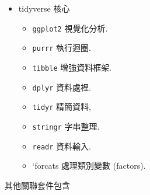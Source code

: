 \documentclass[
]{book}
\providecommand{\tightlist}{%
  \setlength{\itemsep}{0pt}\setlength{\parskip}{0pt}}
\begin{document}
\begin{itemize}
\tightlist
\item
  tidyverse 核心

  \begin{itemize}
  \tightlist
  \item
    \texttt{ggplot2} 視覺化分析.
  \item
    \texttt{purrr} 執行迴圈.
  \item
    \texttt{tibble} 增強資料框架.
  \item
    \texttt{dplyr} 資料處裡.
  \item
    \texttt{tidyr} 精簡資料,
  \item
    \texttt{stringr} 字串整理.
  \item
    \texttt{readr} 資料輸入.
  \item
    `forcats 處理類別變數 (factors).
  \end{itemize}
\end{itemize}

其他關聯套件包含
\end{document}

